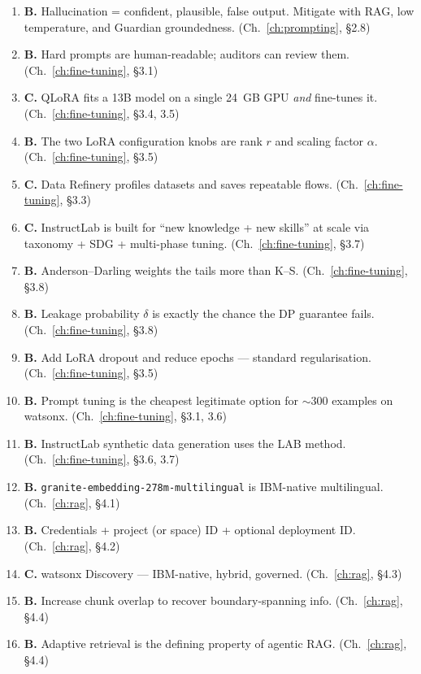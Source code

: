 \begin{enumerate}[leftmargin=*]
\item \textbf{B.} Hallucination = confident, plausible, false output. Mitigate with RAG, low temperature, and Guardian groundedness. (Ch.\ \ref{ch:prompting}, \S 2.8)
\item \textbf{B.} Hard prompts are human-readable; auditors can review them. (Ch.\ \ref{ch:fine-tuning}, \S 3.1)
\item \textbf{C.} QLoRA fits a 13B model on a single 24~GB GPU \emph{and} fine-tunes it. (Ch.\ \ref{ch:fine-tuning}, \S 3.4, 3.5)
\item \textbf{B.} The two LoRA configuration knobs are rank $r$ and scaling factor $\alpha$. (Ch.\ \ref{ch:fine-tuning}, \S 3.5)
\item \textbf{C.} Data Refinery profiles datasets and saves repeatable flows. (Ch.\ \ref{ch:fine-tuning}, \S 3.3)
\item \textbf{C.} InstructLab is built for ``new knowledge + new skills'' at scale via taxonomy + SDG + multi-phase tuning. (Ch.\ \ref{ch:fine-tuning}, \S 3.7)
\item \textbf{B.} Anderson--Darling weights the tails more than K--S. (Ch.\ \ref{ch:fine-tuning}, \S 3.8)
\item \textbf{B.} Leakage probability $\delta$ is exactly the chance the DP guarantee fails. (Ch.\ \ref{ch:fine-tuning}, \S 3.8)
\item \textbf{B.} Add LoRA dropout and reduce epochs --- standard regularisation. (Ch.\ \ref{ch:fine-tuning}, \S 3.5)
\item \textbf{B.} Prompt tuning is the cheapest legitimate option for $\sim$300 examples on watsonx. (Ch.\ \ref{ch:fine-tuning}, \S 3.1, 3.6)
\item \textbf{B.} InstructLab synthetic data generation uses the LAB method. (Ch.\ \ref{ch:fine-tuning}, \S 3.6, 3.7)
\item \textbf{B.} \texttt{granite-embedding-278m-multilingual} is IBM-native multilingual. (Ch.\ \ref{ch:rag}, \S 4.1)
\item \textbf{B.} Credentials + project (or space) ID + optional deployment ID. (Ch.\ \ref{ch:rag}, \S 4.2)
\item \textbf{C.} watsonx Discovery --- IBM-native, hybrid, governed. (Ch.\ \ref{ch:rag}, \S 4.3)
\item \textbf{B.} Increase chunk overlap to recover boundary-spanning info. (Ch.\ \ref{ch:rag}, \S 4.4)
\item \textbf{B.} Adaptive retrieval is the defining property of agentic RAG. (Ch.\ \ref{ch:rag}, \S 4.4)

\end{enumerate}
